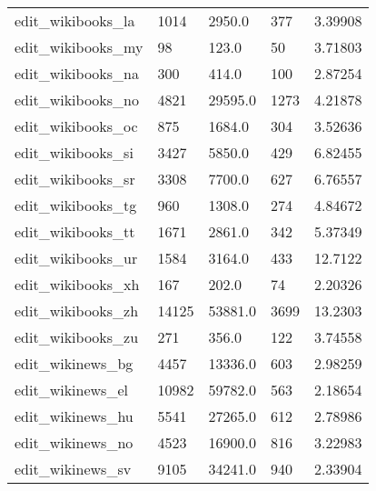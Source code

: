 \begin{longtable}{lllll}
 edit\_wikibooks\_la                                  & 1014       & 2950.0      & 377   & 3.39908    \\
 edit\_wikibooks\_my                                  & 98         & 123.0       & 50    & 3.71803    \\
 edit\_wikibooks\_na                                  & 300        & 414.0       & 100   & 2.87254    \\
 edit\_wikibooks\_no                                  & 4821       & 29595.0     & 1273  & 4.21878    \\
 edit\_wikibooks\_oc                                  & 875        & 1684.0      & 304   & 3.52636    \\
 edit\_wikibooks\_si                                  & 3427       & 5850.0      & 429   & 6.82455    \\
 edit\_wikibooks\_sr                                  & 3308       & 7700.0      & 627   & 6.76557    \\
 edit\_wikibooks\_tg                                  & 960        & 1308.0      & 274   & 4.84672    \\
 edit\_wikibooks\_tt                                  & 1671       & 2861.0      & 342   & 5.37349    \\
 edit\_wikibooks\_ur                                  & 1584       & 3164.0      & 433   & 12.7122    \\
 edit\_wikibooks\_xh                                  & 167        & 202.0       & 74    & 2.20326    \\
 edit\_wikibooks\_zh                                  & 14125      & 53881.0     & 3699  & 13.2303    \\
 edit\_wikibooks\_zu                                  & 271        & 356.0       & 122   & 3.74558    \\
 edit\_wikinews\_bg                                   & 4457       & 13336.0     & 603   & 2.98259    \\
 edit\_wikinews\_el                                   & 10982      & 59782.0     & 563   & 2.18654    \\
 edit\_wikinews\_hu                                   & 5541       & 27265.0     & 612   & 2.78986    \\
 edit\_wikinews\_no                                   & 4523       & 16900.0     & 816   & 3.22983    \\
 edit\_wikinews\_sv                                   & 9105       & 34241.0     & 940   & 2.33904    \\

\end{longtable}
